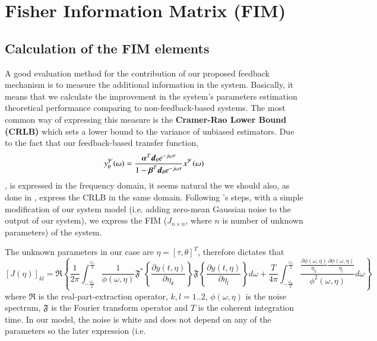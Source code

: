 \chapter{Fisher Information Matrix (FIM)}
\label{apdx:clacFim_chapter}
\section{Calculation of the FIM elements}
A good evaluation method for the contribution of our proposed feedback mechanism is to measure the additional information in the system. Basically, it means that we calculate the improvement in the system's parameters estimation theoretical performance comparing to non-feedback-based systems. The most common way of expressing this measure is the \textbf{Cramer-Rao Lower Bound (CRLB)} which sets a lower bound to the variance of unbiased estimators. Due to the fact that our feedback-based transfer function, 
$$ 
y_{\theta}^{\mathcal{F}}(\omega) 
=
\frac
{
\boldsymbol{\alpha}^{T}
\boldsymbol{d}_{\theta}
e^{-j\omega\tau}
}
{
1
-
\boldsymbol{\beta}^{T}\boldsymbol{d}_{\theta}
e^{-j\omega\tau}
}
x^{\mathcal{F}}(\omega)
$$
,
is expressed in the frequency domain, it seems natural the we should also, as done in \cite{ARIELAZEIRAANDARYENEHORAIFrequencyProcesses}, express the CRLB in the same domain. Following \cite{ARIELAZEIRAANDARYENEHORAIFrequencyProcesses}'s steps, with a simple modification of our system model (i.e. adding zero-mean Gaussian noise to the output of our system), we express the FIM ($ J_{n\times n} $, where $n$ is number of unknown parameters) of the system.
\par The unknown parameters in our case are $ \eta = [\tau,\theta]^{T} $, therefore \cite{ARIELAZEIRAANDARYENEHORAIFrequencyProcesses} dictates that
\begin{equation*}
    \left[J(\eta)\right]_{kl} = 
    \Re\left\{
    \frac{1}{2\pi}
    \int_{-\frac{\omega_{s}}{2}}^{\frac{\omega_{s}}{2}}
    {
    \frac{1}{\phi\left(\omega,\eta\right)}
    \mathfrak{F}^{*}\left\{
    \frac{\partial y(t,\eta)}{\partial\eta_{k}}
    \right\}
    \mathfrak{F}\left\{
    \frac{\partial y(t,\eta)}{\partial\eta_{l}}
    \right\}
    d\omega
    }
    +
    \frac{T}{4\pi}
    \int_{-\frac{\omega_{s}}{2}}^{\frac{\omega_{s}}{2}}
    \frac{
    \frac{\partial\phi\left(\omega,\eta\right)}{\eta_{k}}
    \frac{\partial\phi\left(\omega,\eta\right)}{\eta_{l}}
    }
    {\phi^{2}\left(\omega,\eta\right)}
    d\omega
    \right\}
\end{equation*}
where $\Re$ is the real-part-extraction operator, $k,l = 1..2$, $\phi\left(\omega,\eta\right)$ is the noise spectrum, $\mathfrak{F}$ is the Fourier transform operator and $T$ is the coherent integration time. In our model, the noise is white and does not depend on any of the parameters so the later expression (i.e. 
